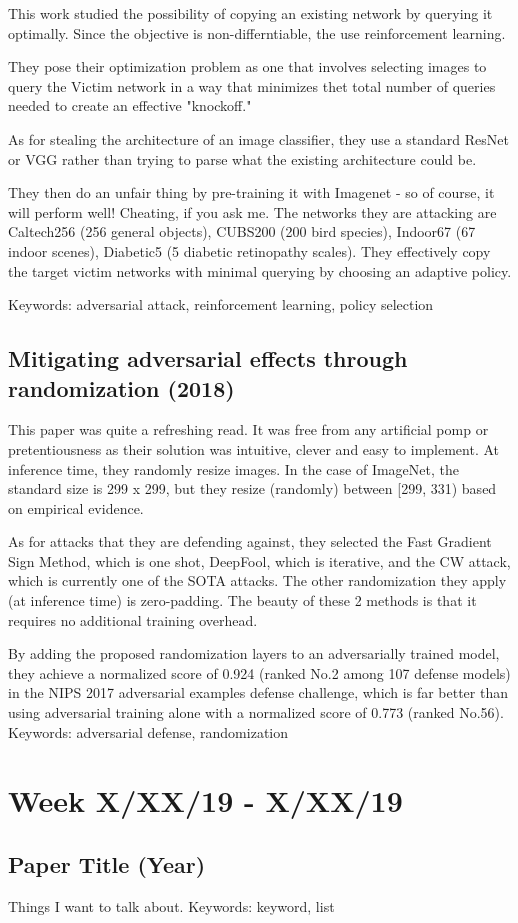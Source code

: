 \documentclass{article}
\begin{document}
This work studied the possibility of copying an existing network by querying it optimally. Since the objective is non-differntiable, the use reinforcement learning.

They pose their optimization problem as one that involves selecting images to query the Victim network in a way that minimizes thet total number of queries needed to create an effective "knockoff."

As for stealing the architecture of an image classifier, they use a standard ResNet or VGG rather than trying to parse what the existing architecture could be.

They then do an unfair thing by pre-training it with Imagenet - so of course, it will perform well! Cheating, if you ask me. The networks they are attacking are Caltech256 (256 general objects), CUBS200 (200 bird species), Indoor67 (67 indoor scenes), Diabetic5 (5 diabetic retinopathy scales). They effectively copy the target victim networks with minimal querying by choosing an adaptive policy.

\newline\newline
Keywords: adversarial attack, reinforcement learning, policy selection

\subsection*{Mitigating adversarial effects through randomization (2018)\cite{xie2017mitigating}}

This paper was quite a refreshing read. It was free from any artificial pomp or pretentiousness as their solution was intuitive, clever and easy to implement. At inference time, they randomly resize images. In the case of ImageNet, the standard size is 299 x 299, but they resize (randomly) between [299, 331) based on empirical evidence.

As for attacks that they are defending against, they selected the Fast Gradient Sign Method, which is one shot, DeepFool, which is iterative, and the CW attack, which is currently one of the SOTA attacks. The other randomization they apply (at inference time) is zero-padding. The beauty of these 2 methods is that it requires no additional training overhead.

By adding the proposed randomization layers to an adversarially trained model, they achieve a normalized score of 0.924 (ranked No.2 among 107 defense models) in the NIPS 2017 adversarial examples defense challenge, which is far better than using adversarial training alone with a normalized score of 0.773 (ranked No.56).
\newline\newline
Keywords: adversarial defense, randomization

\section*{Week X/XX/19 - X/XX/19}
\subsection*{Paper Title (Year)\cite{miller2019adversarial}}

Things I want to talk about.
\newline\newline
Keywords: keyword, list




\end{document}
